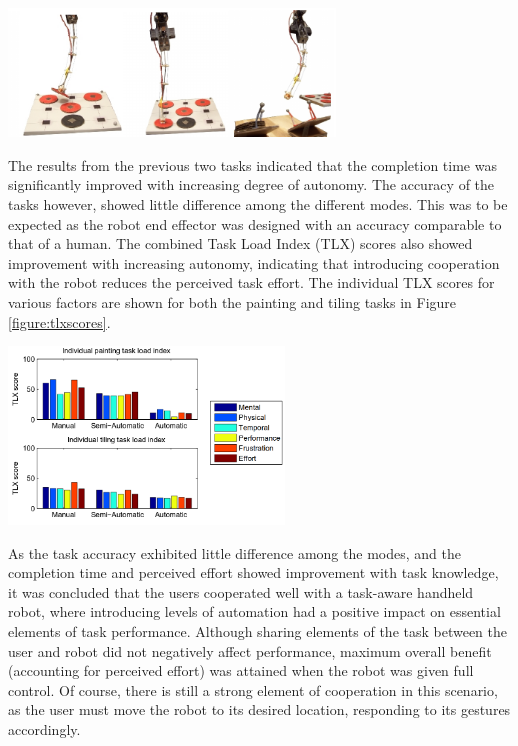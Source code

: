 \documentclass[11pt]{article}
\begin{document}
\begin{center}
\includegraphics[width=0.65\textwidth]{tilingtask.png}
\label{figure:tilingtask}
\end{center}

The results from the previous two tasks indicated that the completion time was significantly improved with increasing degree of autonomy. The accuracy of the tasks however, showed little difference among the different modes. This was to be expected as the robot end effector was designed with an accuracy comparable to that of a human. The combined Task Load Index (TLX) scores also showed improvement with increasing autonomy, indicating that introducing cooperation with the robot reduces the perceived task effort. The individual TLX scores for various factors are shown for both the painting and tiling tasks in Figure \ref{figure:tlxscores}.

\begin{center}
\includegraphics[width = 0.55\textwidth]{tlxscores.png}
\label{figure:tlxscores}
\end{center}

As the task accuracy exhibited little difference among the modes, and the completion time and perceived effort showed improvement with task knowledge, it was concluded that the users cooperated well with a task-aware handheld robot, where introducing levels of automation had a positive impact on essential elements of task performance. Although sharing elements of the task between the user and robot did not negatively affect performance, maximum overall benefit (accounting for perceived effort) was attained when the robot was given full control. Of course, there is still a strong element of cooperation in this scenario, as the user must move the robot to its desired location, responding to its gestures accordingly.
	
\end{document}
